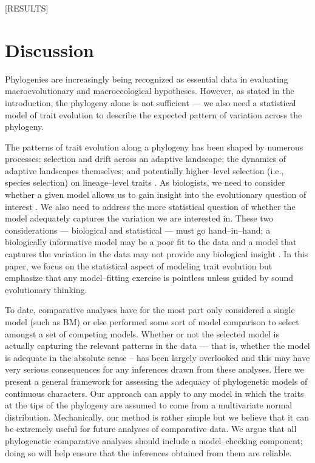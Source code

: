 \documentclass[a4paper,12pt]{article}
\begin{document}
[RESULTS]

\section{Discussion}

Phylogenies are increasingly being recognized as essential data in evaluating macroevolutionary and macroecological hypotheses. However, as stated in the introduction, the phylogeny alone is not sufficient --- we also need a statistical model of trait evolution to describe the expected pattern of variation across the phylogeny. 

The patterns of trait evolution along a phylogeny has been shaped by numerous processes: selection and drift across an adaptive landscape; the dynamics of adaptive landscapes themselves; and potentially higher--level selection (i.e., species selection) on lineage--level traits \citep{PennellPE}. As biologists, we need to consider whether a given model allows us to gain insight into the evolutionary question of interest \citep{HansenOrzack2005, Hansen2012}. We also need to address the more statistical question of whether the model adequately captures the variation we are interested in. These two considerations --- biological and statistical --- must go hand--in--hand; a biologically informative model may be a poor fit to the data and a model that captures the variation in the data may not provide any biological insight \citep{Hansen2012}. In this paper, we focus on the statistical aspect of modeling trait evolution but emphasize that any model--fitting exercise is pointless unless guided by sound evolutionary thinking.

To date, comparative analyses have for the most part only considered a single model (such as BM) or else performed some sort of model comparison to select amongst a set of competing models. Whether or not the selected model is actually capturing the relevant patterns in the data --- that is, whether the model is adequate in the absolute sense -- has been largely overlooked and this may have very serious consequences for any inferences drawn from these analyses. Here we present a general framework for assessing the adequacy of phylogenetic models of continuous characters. Our approach can apply to any model in which the traits at the tips of the phylogeny are assumed to come from a multivariate normal distribution. Mechanically, our method is rather simple but we believe that it can be extremely useful for future analyses of comparative data. We argue that all phylogenetic comparative analyses should include a model--checking component; doing so will help ensure that the inferences obtained from them are reliable.
\end{document}
